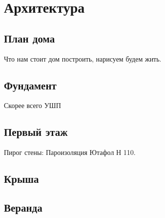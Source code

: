 \part{Архитектура}
\chapter{План дома}
Что нам стоит дом построить, нарисуем будем жить.


\chapter{Фундамент}

Скорее всего УШП

\chapter{Первый этаж}

Пирог стены:
Пароизоляция Ютафол Н 110.

\chapter{Крыша}

\chapter{Веранда}
